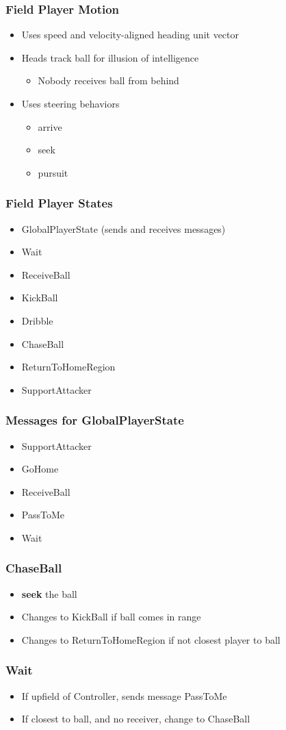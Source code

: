 \documentclass[handout,t,compress]{beamer}
\newcommand{\bframe}[1]{\begin{frame}[fragile]\frametitle{#1}}
\newcommand{\bi}{\begin{itemize}}
\newcommand{\li}{\item}
\newcommand{\ei}{\end{itemize}}
\begin{document}
\bframe{Field Player Motion}
\bi
\li Uses speed and velocity-aligned heading unit vector
\li Heads track ball for illusion of intelligence
\bi\li Nobody receives ball from behind \ei
\li Uses steering behaviors
\bi\li arrive\li seek\li pursuit\ei
\ei
\end{frame}

\bframe{Field Player States}
\begin{itemize}
\item GlobalPlayerState (sends and receives messages)
\item Wait
\item ReceiveBall
\item KickBall
\item Dribble
\item ChaseBall
\item ReturnToHomeRegion
\item SupportAttacker
\end{itemize}
\end{frame}

\bframe{Messages for GlobalPlayerState}
\begin{itemize}
\item SupportAttacker
\item GoHome
\item ReceiveBall
\item PassToMe
\item Wait
\end{itemize}
\end{frame}

\bframe{ChaseBall}
\begin{itemize}
\item {\bf seek} the ball
\item Changes to KickBall if ball comes in range
\item Changes to ReturnToHomeRegion if not closest player to ball
\end{itemize}
\end{frame}

\bframe{Wait}
\begin{itemize}
\item If upfield of Controller, sends message PassToMe
\item If closest to ball, and no receiver, change to ChaseBall
\end{itemize}
\end{frame}
\end{document}
